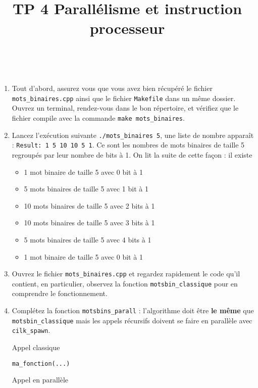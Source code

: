 \documentclass{cours}
\title{TP 4 Parallélisme et instruction processeur}
\newcommand{\lsti}[1]{\lstinline{#1}{}}
\begin{document}
\maketitle

\begin{exercice}\
\label{exo:binary}

\begin{enumerate}
\item Tout d'abord, assurez vous que vous avez bien récupéré le fichier \lsti{mots_binaires.cpp} ainsi que le fichier \lsti{Makefile} dans un même dossier. Ouvrez un terminal, rendez-vous dans le bon répertoire, et vérifiez que le fichier compile avec la commande \lsti{make mots_binaires}.

\item Lancez l'exécution suivante \lsti{./mots_binaires 5}, une liste de nombre apparaît : \lsti{Result: 1 5 10 10 5 1}. Ce sont les nombres de mots binaires de taille 5 regroupés par leur nombre de bits à 1. On lit la suite de cette façon : il existe
\begin{itemize}
\item 1 mot binaire de taille 5 avec 0 bit à 1
\item 5 mots binaires de taille 5 avec 1 bit à 1
\item 10 mots binaires de taille 5 avec 2 bits à 1
\item 10 mots binaires de taille 5 avec 3 bits à 1
\item 5 mots binaires de taille 5 avec 4 bits à 1
\item 1 mot binaire de taille 5 avec 0 bit à 1
\end{itemize}

\item Ouvrez le fichier \lsti{mots_binaires.cpp} et regardez rapidement le code qu'il contient, en particulier, observez la fonction \lsti{motsbin_classique} pour en comprendre le fonctionnement.

\item Complétez la fonction \lsti{motsbins_parall} : l'algorithme doit être \textbf{le même} que \lsti{motsbin_classique} mais les appels récursifs doivent se faire en parallèle avec \lsti{cilk_spawn}.

Appel classique

\begin{lstlisting}
ma_fonction(...)
\end{lstlisting}

Appel en parallèle


\end{enumerate}
\end{exercice}
\end{document}
